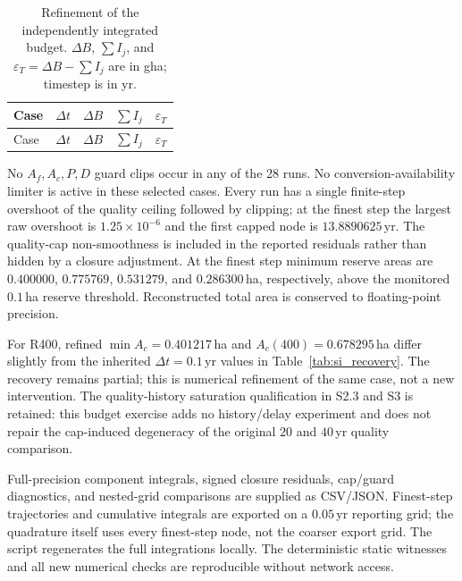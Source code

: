 \documentclass[11pt,a4paper]{article}
\begin{document}
\clearpage
{\small
\begin{longtable}{lrrrr}
\caption{Refinement of the independently integrated budget. $\Delta B$, $\sum I_j$, and $\varepsilon_T=\Delta B-\sum I_j$ are in gha; timestep is in yr.}\label{tab:si_c13refine}\\
\toprule
Case & $\Delta t$ & $\Delta B$ & $\sum I_j$ & $\varepsilon_T$ \\
\midrule
\endfirsthead
\toprule
Case & $\Delta t$ & $\Delta B$ & $\sum I_j$ & $\varepsilon_T$ \\
\midrule
\endhead

\end{longtable}
}

No $A_f,A_c,P,D$ guard clips occur in any of the 28 runs. No conversion-availability limiter is active in these selected cases. Every run has a single finite-step overshoot of the quality ceiling followed by clipping; at the finest step the largest raw overshoot is $1.25\times10^{-6}$ and the first capped node is $13.8890625$\,yr. The quality-cap non-smoothness is included in the reported residuals rather than hidden by a closure adjustment. At the finest step minimum reserve areas are $0.400000$, $0.775769$, $0.531279$, and $0.286300$\,ha, respectively, above the monitored $0.1$\,ha reserve threshold. Reconstructed total area is conserved to floating-point precision.

For R400, refined $\min A_c=0.401217$\,ha and $A_c(400)=0.678295$\,ha differ slightly from the inherited $\Delta t=0.1$\,yr values in Table~\ref{tab:si_recovery}. The recovery remains partial; this is numerical refinement of the same case, not a new intervention. The quality-history saturation qualification in S2.3 and S3 is retained: this budget exercise adds no history/delay experiment and does not repair the cap-induced degeneracy of the original $20$ and $40$\,yr quality comparison.

Full-precision component integrals, signed closure residuals, cap/guard diagnostics, and nested-grid comparisons are supplied as CSV/JSON. Finest-step trajectories and cumulative integrals are exported on a $0.05$\,yr reporting grid; the quadrature itself uses every finest-step node, not the coarser export grid. The script regenerates the full integrations locally. The deterministic static witnesses and all new numerical checks are reproducible without network access.
\end{document}
